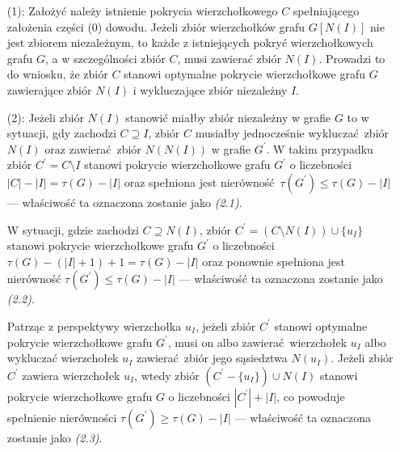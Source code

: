 {\begin{bproof}
\begin{itemize}
      W sytuacji, gdy $I = X$, w związku z tym, że $Y \neq \emptyset$, tak jak w poprzednim przypadku spełniona jest nierówność $|Y|\geq|I|-|X|+1$.
      Ponieważ zbiór $I$ jest niezależny w grafie $G$, zastąpienie zbioru $Y \cup X$ zbiorem $N(I)$ w pokryciu wierzchołkowym $C$ owocuje pokryciem wierzchołkowym $C^\prime$ grafu $G$ o liczebności $|C^\prime| \leq |C|$.
      Wobec tego toku rozumowania łatwo zauważyć, że zbiór $C^\prime$ stanowi pokrycie wierzchołkowe grafu $G$ o najmniejszej liczebności, które zawiera zbiór $N(I)$ oraz wyłącza zbiór niezależny $I$.
      \item[(1):] Założyć należy istnienie pokrycia wierzchołkowego $C$ spełniającego założenia części (0) dowodu.
      Jeżeli zbiór wierzchołków grafu $G[N(I)]$ nie jest zbiorem niezależnym, to każde z istniejących pokryć wierzchołkowych grafu $G$, a w szczególności zbiór $C$, musi zawierać zbiór $N(I)$.
      Prowadzi to do wniosku, że zbiór $C$ stanowi optymalne pokrycie wierzchołkowe grafu $G$ zawierające zbiór $N(I)$ i wykluczające zbiór niezależny $I$.
      \item[(2):] Jeżeli zbiór $N(I)$ stanowić miałby zbiór niezależny w grafie $G$ to w sytuacji, gdy zachodzi $C \supseteq I$, zbiór $C$ musiałby jednocześnie wykluczać zbiór $N(I)$ oraz zawierać zbiór $N(N(I))$ w grafie $G^\prime$.
      W takim przypadku zbiór $C^\prime=C \setminus I$ stanowi pokrycie wierzchołkowe grafu $G^\prime$ o liczebności $|C|-|I|=\tau(G)-|I|$ oraz spełniona jest nierówność $\tau(G^\prime)\leq\tau(G)-|I|$ --- właściwość ta oznaczona zostanie jako \textit{(2.1)}.

      W sytuacji, gdzie zachodzi $C \supseteq N(I)$, zbiór $C^\prime=(C \setminus N(I))\cup \{u_I\}$ stanowi pokrycie wierzchołkowe grafu $G^\prime$ o liczebności $\tau(G)-(|I|+1)+1=\tau(G)-|I|$ oraz ponownie spełniona jest nierówność $\tau(G^\prime)\leq\tau(G)-|I|$ --- właściwość ta oznaczona zostanie jako \textit{(2.2)}.

      Patrząc z perspektywy wierzchołka $u_I$, jeżeli zbiór $C^\prime$ stanowi optymalne pokrycie wierzchołkowe grafu $G^\prime$, musi on albo zawierać wierzchołek $u_I$ albo wykluczać wierzchołek $u_I$ zawierać zbiór jego sąsiedztwa $N(u_I)$.
      Jeżeli zbiór $C^\prime$ zawiera wierzchołek $u_I$, wtedy zbiór $(C^\prime - \{u_I\}) \cup N(I)$ stanowi pokrycie wierzchołkowe grafu $G$ o liczebności $|C^\prime|+|I|$, co powoduje spełnienie nierówności $\tau(G^\prime)\geq \tau(G)-|I|$ --- właściwość ta oznaczona zostanie jako \textit{(2.3)}.


\end{itemize}
\end{bproof}}

